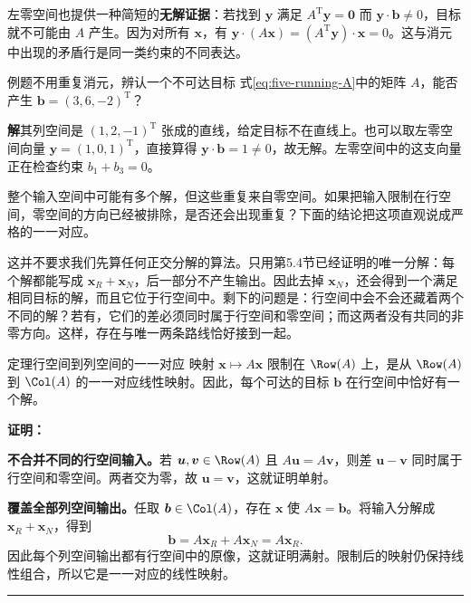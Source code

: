 \documentclass[a4paper,12pt,twoside,openany,fontset=none]{ctexbook}
\newcounter{theorem}[chapter]
\newenvironment{theorem}[1][]{\begin{thmBox}{定理}{#1}}{\end{thmBox}}
\newcounter{example}[chapter]
\newenvironment{example}[1][]{\begin{exBox}{例题}{#1}}{\end{exBox}}
\renewenvironment{proof}{
    \par\vspace{0.5em}\noindent
    \textbf{\color{LogicColor} 证明：}
}{
    \hfill \textcolor{LogicColor}{\rule{0.6em}{0.6em}} \par
}
\numberwithin{equation}{chapter}
\begin{document}
左零空间也提供一种简短的\textbf{无解证据}：若找到 $\boldsymbol y$ 满足 $A^{\mathrm T}\boldsymbol y=\boldsymbol0$ 而 $\boldsymbol y\cdot\boldsymbol b\ne0$，目标就不可能由 $A$ 产生。因为对所有 $\boldsymbol x$，有 $\boldsymbol y\cdot(A\boldsymbol x)=(A^{\mathrm T}\boldsymbol y)\cdot\boldsymbol x=0$。这与消元中出现的矛盾行是同一类约束的不同表达。

\begin{example}[不用重复消元，辨认一个不可达目标]
式\eqref{eq:five-running-A}中的矩阵 $A$，能否产生 $\boldsymbol b=(3,6,-2)^{\mathrm T}$？
\end{example}
\textbf{解}\quad 其列空间是 $(1,2,-1)^{\mathrm T}$ 张成的直线，给定目标不在直线上。也可以取左零空间向量 $\boldsymbol y=(1,0,1)^{\mathrm T}$，直接算得 $\boldsymbol y\cdot\boldsymbol b=1\ne0$，故无解。左零空间中的这支向量正在检查约束 $b_1+b_3=0$。

整个输入空间中可能有多个解，但这些重复来自零空间。如果把输入限制在行空间，零空间的方向已经被排除，是否还会出现重复？下面的结论把这项直观说成严格的一一对应。

这并不要求我们先算任何正交分解的算法。只用第5.4节已经证明的唯一分解：每个解都能写成 $\boldsymbol x_R+\boldsymbol x_N$，后一部分不产生输出。因此去掉 $\boldsymbol x_N$，还会得到一个满足相同目标的解，而且它位于行空间中。剩下的问题是：行空间中会不会还藏着两个不同的解？若有，它们的差必须同时属于行空间和零空间；而这两者没有共同的非零方向。这样，存在与唯一两条路线恰好接到一起。

\begin{theorem}[行空间到列空间的一一对应]
映射 $\boldsymbol x\mapsto A\boldsymbol x$ 限制在 $\Row(A)$ 上，是从 $\Row(A)$ 到 $\Col(A)$ 的一一对应线性映射。因此，每个可达的目标 $\boldsymbol b$ 在行空间中恰好有一个解。
\end{theorem}
\begin{proof}
\textbf{不合并不同的行空间输入。}若 $\boldsymbol u,\boldsymbol v\in\Row(A)$ 且 $A\boldsymbol u=A\boldsymbol v$，则差 $\boldsymbol u-\boldsymbol v$ 同时属于行空间和零空间。两者交为零，故 $\boldsymbol u=\boldsymbol v$，这就证明单射。

\textbf{覆盖全部列空间输出。}任取 $\boldsymbol b\in\Col(A)$，存在 $\boldsymbol x$ 使 $A\boldsymbol x=\boldsymbol b$。将输入分解成 $\boldsymbol x_R+\boldsymbol x_N$，得到
\begin{equation}
 \boldsymbol b=A\boldsymbol x_R+A\boldsymbol x_N=A\boldsymbol x_R.
\end{equation}
因此每个列空间输出都有行空间中的原像，这就证明满射。限制后的映射仍保持线性组合，所以它是一一对应的线性映射。
\end{proof}
\end{document}

